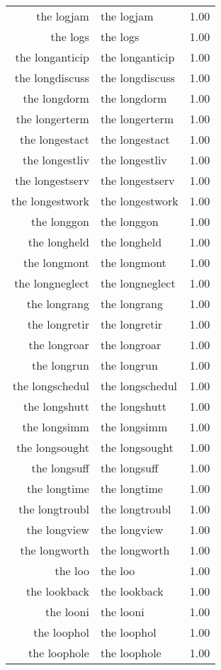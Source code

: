 \begin{table}[ht]
\begin{tabular}{rlr}
  the logjam & the logjam & 1.00 \\ 
  the logs & the logs & 1.00 \\ 
  the longanticip & the longanticip & 1.00 \\ 
  the longdiscuss & the longdiscuss & 1.00 \\ 
  the longdorm & the longdorm & 1.00 \\ 
  the longerterm & the longerterm & 1.00 \\ 
  the longestact & the longestact & 1.00 \\ 
  the longestliv & the longestliv & 1.00 \\ 
  the longestserv & the longestserv & 1.00 \\ 
  the longestwork & the longestwork & 1.00 \\ 
  the longgon & the longgon & 1.00 \\ 
  the longheld & the longheld & 1.00 \\ 
  the longmont & the longmont & 1.00 \\ 
  the longneglect & the longneglect & 1.00 \\ 
  the longrang & the longrang & 1.00 \\ 
  the longretir & the longretir & 1.00 \\ 
  the longroar & the longroar & 1.00 \\ 
  the longrun & the longrun & 1.00 \\ 
  the longschedul & the longschedul & 1.00 \\ 
  the longshutt & the longshutt & 1.00 \\ 
  the longsimm & the longsimm & 1.00 \\ 
  the longsought & the longsought & 1.00 \\ 
  the longsuff & the longsuff & 1.00 \\ 
  the longtime & the longtime & 1.00 \\ 
  the longtroubl & the longtroubl & 1.00 \\ 
  the longview & the longview & 1.00 \\ 
  the longworth & the longworth & 1.00 \\ 
  the loo & the loo & 1.00 \\ 
  the lookback & the lookback & 1.00 \\ 
  the looni & the looni & 1.00 \\ 
  the loophol & the loophol & 1.00 \\ 
  the loophole & the loophole & 1.00 \\ 

\end{tabular}
\end{table}
